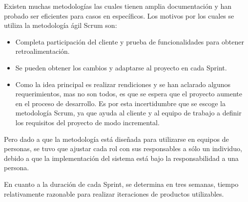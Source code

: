 Existen muchas metodologías las cuales tienen amplia documentación y han probado ser eficientes para casos en específicos. Los motivos por los cuales se utiliza la metodología ágil Scrum son:

\begin{itemize}
    \item Completa participación del cliente y prueba de funcionalidades para obtener retroalimentación.

    \item Se pueden obtener los cambios y adaptarse al proyecto en cada Sprint.

    \item Como la idea principal es realizar rendiciones y se han aclarado algunos requerimientos, mas no son todos, es que se espera que el proyecto aumente en el proceso de desarrollo. Es por esta incertidumbre que se escoge la metodología Scrum, ya que ayuda al cliente y al equipo de trabajo a definir los requisitos del proyecto de modo incremental.
\end{itemize}

Pero dado a que la metodología está diseñada para utilizarse en equipos de personas, se tuvo que ajustar cada rol con sus responsables a sólo un individuo, debido a que la implementación del sistema está bajo la responsabilidad a una persona.

En cuanto a la duración de cada Sprint, se determina en tres semanas, tiempo relativamente razonable para realizar iteraciones de productos utilizables.

